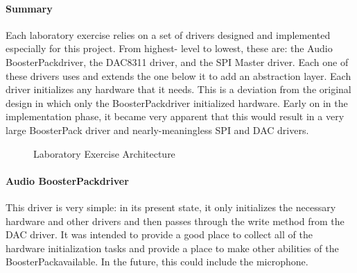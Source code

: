 \documentclass[titlepage]{article}
\begin{document}
\paragraph{Summary}
Each laboratory exercise relies on a set of drivers designed and implemented especially for this project. From highest-
level to lowest, these are: the Audio BoosterPack\textregistered\space driver, the DAC8311 driver, and the SPI Master driver. 
Each one of these drivers uses and extends the one below it to add an abstraction layer. Each driver initializes any hardware 
that it needs. This is a deviation from the original design in which only the BoosterPack\textregistered\space driver initialized 
hardware. Early on in the implementation phase, it became very apparent that this would result in a very large BoosterPack\textregistered\space
driver and nearly-meaningless SPI and DAC drivers.
\begin{figure}[H]
    \caption{Laboratory Exercise Architecture}
\end{figure}

\paragraph{Audio BoosterPack\textregistered driver}
This driver is very simple: in its present state, it only initializes the necessary hardware and other drivers and then 
passes through the write method from the DAC driver. It was intended to provide a good place to collect all of the 
hardware initialization tasks and provide a place to make other abilities of the BoosterPack\textregistered available. In 
the future, this could include the microphone.
\end{document}
